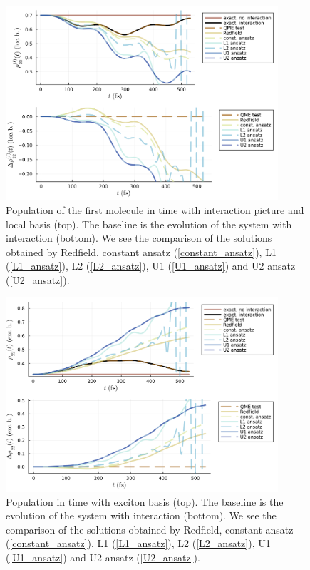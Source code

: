 \newpage
\begin{figure}[H]
\centering
\includegraphics[width=0.9\textwidth]{img/ansatz/ansatz01_I_joined_intloc22.png}
\caption{Population of the first molecule in time with interaction picture and local basis (top). The baseline is the evolution of the system with interaction (bottom). We see the comparison of the solutions obtained by Redfield, constant ansatz (\ref{constant_ansatz}), L1 (\ref{L1_ansatz}), L2 (\ref{L2_ansatz}), U1 (\ref{U1_ansatz}) and U2 ansatz (\ref{U2_ansatz}).}
\label{img:ansatz01_I_joined_intloc22}
\end{figure}

\begin{figure}[H]
\centering
\includegraphics[width=0.9\textwidth]{img/ansatz/ansatz01_I_joined_excloc22.png}
\caption{Population in time with exciton basis (top). The baseline is the evolution of the system with interaction (bottom). We see the comparison of the solutions obtained by Redfield, constant ansatz (\ref{constant_ansatz}), L1 (\ref{L1_ansatz}), L2 (\ref{L2_ansatz}), U1 (\ref{U1_ansatz}) and U2 ansatz (\ref{U2_ansatz}).}
\label{img:ansatz01_I_joined_excloc22}
\end{figure}

